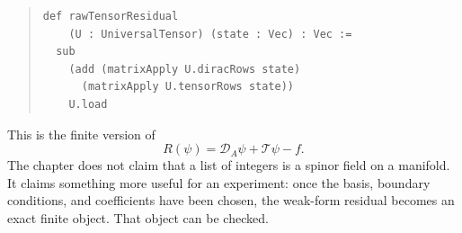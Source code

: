 \begin{quote}\small
\begin{verbatim}
def rawTensorResidual
    (U : UniversalTensor) (state : Vec) : Vec :=
  sub
    (add (matrixApply U.diracRows state)
      (matrixApply U.tensorRows state))
    U.load
\end{verbatim}
\end{quote}

This is the finite version of
\[
  R(\psi) = \mathcal D_A\psi + \mathcal T\psi - f.
\]
The chapter does not claim that a list of integers is a spinor field on a manifold. It claims something more
useful for an experiment: once the basis, boundary conditions, and coefficients have been chosen, the weak-form
residual becomes an exact finite object. That object can be checked.
